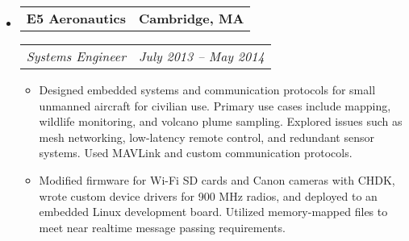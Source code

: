 \documentclass[10pt,letterpaper]{article}
\makeatletter
\newcommand{\headerrow}[2]
{\begin{tabular*}{\linewidth}{l@{\extracolsep{\fill}}r}
	#1 &
	#2 \\
\end{tabular*}}
\makeatother
\begin{document}
\begin{itemize}
    \item
    \headerrow
		{\textbf{E5 Aeronautics}}
		{\textbf{Cambridge, MA}}
	\headerrow
		{\emph{Systems Engineer}}
		{\emph{July 2013 -- May 2014}}
    \begin{itemize}
        \item Designed embedded systems and communication protocols for small unmanned aircraft for civilian use.  Primary use cases include mapping, wildlife monitoring, and volcano plume sampling.  Explored issues such as mesh networking, low-latency remote control, and redundant sensor systems.  Used MAVLink and custom communication protocols.
        \item Modified firmware for Wi-Fi SD cards and Canon cameras with CHDK, wrote custom device drivers for 900 MHz radios, and deployed to an embedded Linux development board.  Utilized memory-mapped files to meet near realtime message passing requirements.
    \end{itemize}



\end{itemize}
\end{document}
